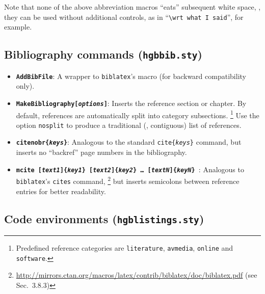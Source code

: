 \documentclass[english]{hgbarticle}
\begin{document}
\noindent 
Note that none of the above abbreviation macros ``eats'' subsequent white space,
\ie, they can be used without additional controls, as in ``\verb!\wrt what I said!'',
for example.

\subsection{Bibliography commands (\texttt{hgbbib.sty})}



\begin{itemize}
\item
\textbf{\texttt{{\bs}AddBibFile}}: A wrapper to \texttt{biblatex}'s \verb!! macro
(for backward compatibility only).
\item
\textbf{\texttt{{\bs}MakeBibliography[\emph{options}]}}: Inserts the reference section or chapter.
By default, references are automatically split into category subsections.%
\footnote{Predefined reference categories are \texttt{literature}, \texttt{avmedia}, \texttt{online}
and \texttt{software}.}
Use the option \texttt{nosplit} to produce a traditional (\ie, contiguous) list of references.
\item
\textbf{\texttt{{\bs}citenobr\{\emph{keys}\}}}: Analogous to the standard \texttt{{\bs}cite\{\emph{keys}\}} command, but inserts no ``backref'' page numbers in the bibliography.
\item
\textbf{\texttt{{\bs}mcite%
[\emph{text1}]\{\emph{key1}\}%
[\emph{text2}]\{\emph{key2}\}%
\ldots
[\emph{textN}]\{\emph{keyN}\}%
}}:
Analogous to \texttt{bib\-la\-tex}'s \texttt{{\bs}cites} command,%
\footnote{\url{http://mirrors.ctan.org/macros/latex/contrib/biblatex/doc/biblatex.pdf} (see Sec.~3.8.3)}
but inserts semicolons between reference entries for better readability.
\end{itemize}



\subsection{Code environments (\texttt{hgblistings.sty})}
\end{document}
